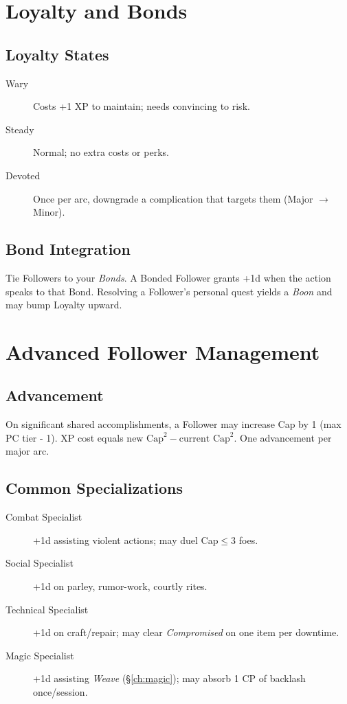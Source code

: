 \begin{multicols}{2}
\section{Loyalty and Bonds}

\subsection*{Loyalty States}
\begin{description}
  \item[Wary] Costs +1 XP to maintain; needs convincing to risk.
  \item[Steady] Normal; no extra costs or perks.
  \item[Devoted] Once per arc, downgrade a complication that targets them (Major \(\rightarrow\) Minor). 
\end{description}

\subsection*{Bond Integration}
Tie Followers to your \emph{Bonds}. A Bonded Follower grants +1d when the action speaks to that Bond. Resolving a Follower’s personal quest yields a \emph{Boon} and may bump Loyalty upward.

\section{Advanced Follower Management}

\subsection*{Advancement}
On significant shared accomplishments, a Follower may increase Cap by 1 (max PC tier - 1). XP cost equals \(\text{new Cap}^2 - \text{current Cap}^2\). One advancement per major arc.

\subsection*{Common Specializations}
\begin{description}
  \item[Combat Specialist] +1d assisting violent actions; may duel Cap\(\leq\)3 foes.
  \item[Social Specialist] +1d on parley, rumor-work, courtly rites.
  \item[Technical Specialist] +1d on craft/repair; may clear \emph{Compromised} on one item per downtime.
  \item[Magic Specialist] +1d assisting \emph{Weave} (\S\ref{ch:magic}); may absorb 1 CP of backlash once/session. 
\end{description}


\end{multicols}
